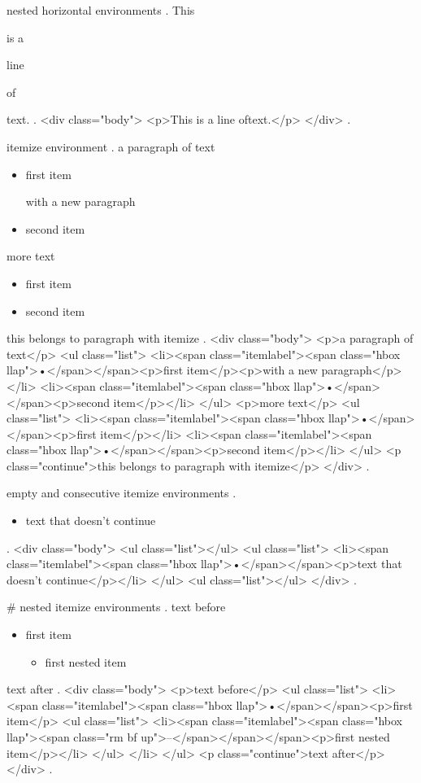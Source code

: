 nested horizontal environments
.
This \begin{empty}is a \begin{empty}line\end{empty} of\end{empty} text.
.
<div class="body">
<p>This is a line​ of​ text.</p>
</div>
.


itemize environment
.
a paragraph of text

\begin{itemize}
    \item first item

        with a new paragraph
    \item second item
\end{itemize}
%

more text

\begin{itemize}
    \item first item
    \item second item

\end{itemize}
this belongs to paragraph with itemize
.
<div class="body">
<p>a paragraph of text</p>
<ul class="list">
<li><span class="itemlabel"><span class="hbox llap">•</span></span><p>ﬁrst item</p><p>with a new paragraph</p></li>
<li><span class="itemlabel"><span class="hbox llap">•</span></span><p>second item</p></li>
</ul>
<p>more text</p>
<ul class="list">
<li><span class="itemlabel"><span class="hbox llap">•</span></span><p>ﬁrst item</p></li>
<li><span class="itemlabel"><span class="hbox llap">•</span></span><p>second item</p></li>
</ul>
<p class="continue">this belongs to paragraph with itemize</p>
</div>
.


empty and consecutive itemize environments
.
\begin{itemize}

\end{itemize}
\begin{itemize}
    \item text that doesn't continue
\end{itemize}
\begin{itemize}
\end{itemize}
.
<div class="body">
<ul class="list"></ul>
<ul class="list">
<li><span class="itemlabel"><span class="hbox llap">•</span></span><p>text that doesn’t continue</p></li>
</ul>
<ul class="list"></ul>
</div>
.


#
nested itemize environments
.
text before
\begin{itemize}
    \item first item
        \begin{itemize}
            \item first nested item
        \end{itemize}
\end{itemize}
text after
.
<div class="body">
<p>text before</p>
<ul class="list">
<li><span class="itemlabel"><span class="hbox llap">•</span></span><p>ﬁrst item</p>
<ul class="list">
<li><span class="itemlabel"><span class="hbox llap"><span class="rm bf up">–</span></span></span><p>ﬁrst nested item</p></li>
</ul>
</li>
</ul>
<p class="continue">text after</p>
</div>
.


